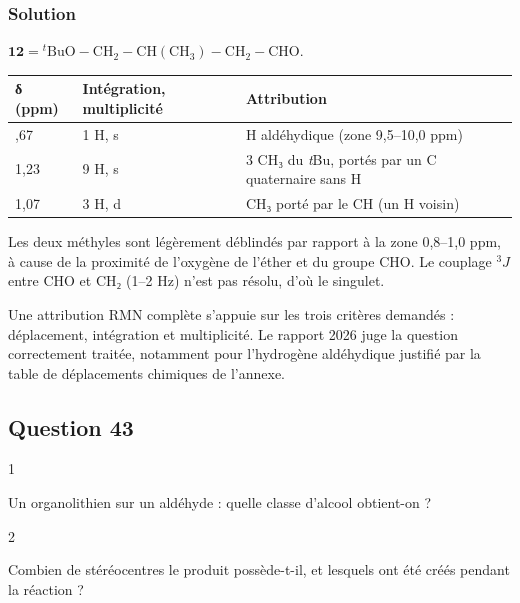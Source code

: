 \documentclass[11pt,a4paper]{article}
\begin{document}
\hypertarget{solution-41}{%
\subsubsection{Solution}\label{solution-41}}

\(\mathbf{12} = {}^t\mathrm{BuO{-}CH_2{-}CH(CH_3){-}CH_2{-}CHO}\).

\begin{longtable}[]{@{}lll@{}}
\toprule\noalign{}
δ (ppm) & Intégration, multiplicité & Attribution \\
\midrule\noalign{}
\endhead
\bottomrule\noalign{}
\endlastfoot
9,67 & 1 H, s & H aldéhydique (zone 9,5--10,0 ppm) \\
1,23 & 9 H, s & 3 CH₃ du \emph{t}Bu, portés par un C quaternaire sans H \\
1,07 & 3 H, d & CH₃ porté par le CH (un H voisin) \\
\end{longtable}

Les deux méthyles sont légèrement déblindés par rapport à la zone 0,8--1,0 ppm, à cause de la proximité de l'oxygène de l'éther et du groupe CHO. Le couplage \(^3J\) entre CHO et CH₂ (1--2 Hz) n'est pas résolu, d'où le singulet.

\begin{jury}

Une attribution RMN complète s'appuie sur les trois critères demandés : déplacement, intégration et multiplicité. Le rapport 2026 juge la question correctement traitée, notamment pour l'hydrogène aldéhydique justifié par la table de déplacements chimiques de l'annexe.

\end{jury}

\hypertarget{question-43}{%
\subsection{Question 43}\label{question-43}}

\begin{indication}{1}

Un organolithien sur un aldéhyde : quelle classe d'alcool obtient-on ?

\end{indication}

\begin{indication}{2}

Combien de stéréocentres le produit possède-t-il, et lesquels ont été créés pendant la réaction ?

\end{indication}
\end{document}
